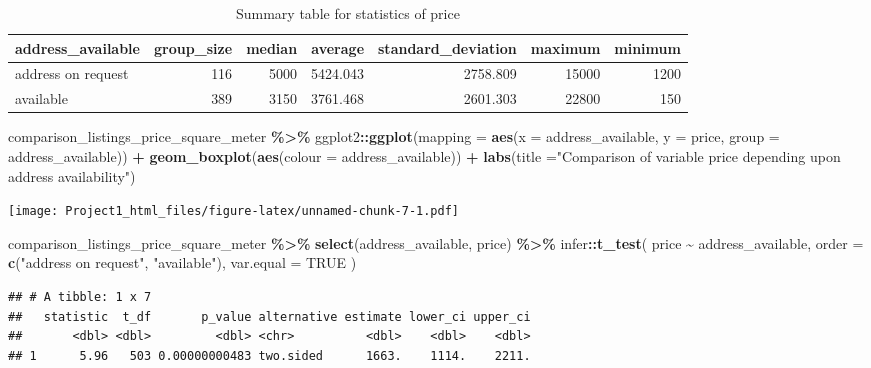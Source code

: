 \documentclass[
]{article}
\newenvironment{Shaded}{\begin{snugshade}}{\end{snugshade}}
\newcommand{\AttributeTok}[1]{\textcolor[rgb]{0.13,0.29,0.53}{#1}}
\newcommand{\ConstantTok}[1]{\textcolor[rgb]{0.56,0.35,0.01}{#1}}
\newcommand{\FunctionTok}[1]{\textcolor[rgb]{0.13,0.29,0.53}{\textbf{#1}}}
\newcommand{\NormalTok}[1]{#1}
\newcommand{\SpecialCharTok}[1]{\textcolor[rgb]{0.81,0.36,0.00}{\textbf{#1}}}
\newcommand{\StringTok}[1]{\textcolor[rgb]{0.31,0.60,0.02}{#1}}
\begin{document}
\begin{longtable}[l]{lrrrrrr}
\caption{\label{tab:unnamed-chunk-7}Summary table for statistics of price}\\
\toprule
address\_available & group\_size & median & average & standard\_deviation & maximum & minimum\\
\midrule
address on request & 116 & 5000 & 5424.043 & 2758.809 & 15000 & 1200\\
available & 389 & 3150 & 3761.468 & 2601.303 & 22800 & 150\\
\bottomrule
\end{longtable}

\begin{Shaded}
\begin{Highlighting}[]
\NormalTok{comparison\_listings\_price\_square\_meter }\SpecialCharTok{\%\textgreater{}\%}
\NormalTok{  ggplot2}\SpecialCharTok{::}\FunctionTok{ggplot}\NormalTok{(}\AttributeTok{mapping =} \FunctionTok{aes}\NormalTok{(}\AttributeTok{x =}\NormalTok{ address\_available, }\AttributeTok{y =}\NormalTok{ price, }\AttributeTok{group =}
\NormalTok{                                  address\_available)) }\SpecialCharTok{+}
  \FunctionTok{geom\_boxplot}\NormalTok{(}\FunctionTok{aes}\NormalTok{(}\AttributeTok{colour =}\NormalTok{ address\_available)) }\SpecialCharTok{+}
  \FunctionTok{labs}\NormalTok{(}\AttributeTok{title =}\StringTok{"Comparison of variable price depending upon address availability"}\NormalTok{)}
\end{Highlighting}
\end{Shaded}

\texttt{[image: Project1\_html\_files/figure-latex/unnamed-chunk-7-1.pdf]}

\begin{Shaded}
\begin{Highlighting}[]
\NormalTok{comparison\_listings\_price\_square\_meter }\SpecialCharTok{\%\textgreater{}\%} \FunctionTok{select}\NormalTok{(address\_available, price) }\SpecialCharTok{\%\textgreater{}\%}
\NormalTok{  infer}\SpecialCharTok{::}\FunctionTok{t\_test}\NormalTok{(}
\NormalTok{    price }\SpecialCharTok{\textasciitilde{}}\NormalTok{ address\_available,}
    \AttributeTok{order =} \FunctionTok{c}\NormalTok{(}\StringTok{"address on request"}\NormalTok{, }\StringTok{"available"}\NormalTok{),}
    \AttributeTok{var.equal =} \ConstantTok{TRUE}
\NormalTok{  )}
\end{Highlighting}
\end{Shaded}

\begin{verbatim}
## # A tibble: 1 x 7
##   statistic  t_df       p_value alternative estimate lower_ci upper_ci
##       <dbl> <dbl>         <dbl> <chr>          <dbl>    <dbl>    <dbl>
## 1      5.96   503 0.00000000483 two.sided      1663.    1114.    2211.
\end{verbatim}
\end{document}
